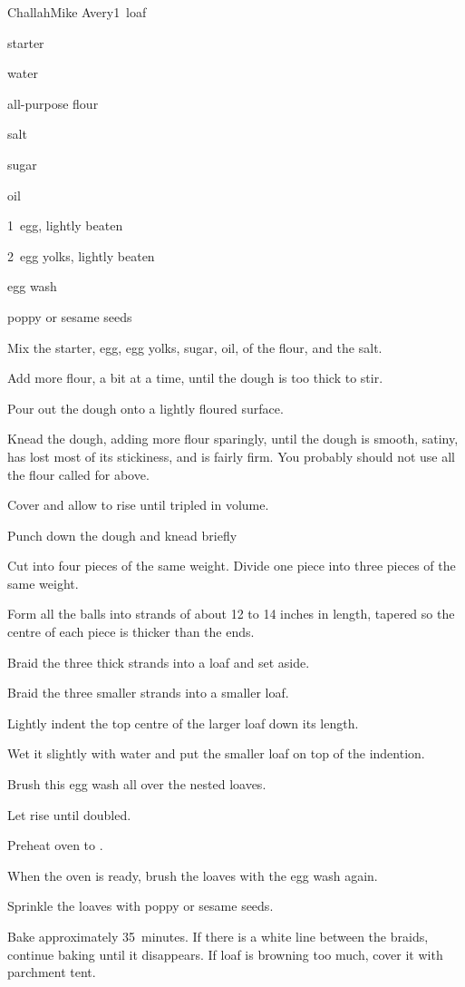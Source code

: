 \begin{recipe}{Challah\FIXME}{Mike Avery}{1~loaf}

\begin{ingredients}
\item {} starter
\item \C{\half} water
\item \C{3\twothird} all-purpose flour
\item {} salt
\item \C{\quarter} sugar
\item \C{\quarter} oil
\item 1~egg, lightly beaten
\item 2~egg yolks, lightly beaten
\item egg wash
\item poppy or sesame seeds
\end{ingredients}

\begin{directions}
\item Mix the starter, egg, egg yolks, sugar, oil, \half{} of the flour, and the salt. 
\item Add more flour, a bit at a time, until the dough is too thick to stir.
\item Pour out the dough onto a lightly floured surface.
\item Knead the dough, adding more flour sparingly, until the dough is smooth, satiny, has lost most of its stickiness, and is fairly firm. You probably should not use all the flour called for above.
\item Cover and allow to rise until tripled in volume.
\item Punch down the dough and knead briefly
\item Cut into four pieces of the same weight. Divide one piece into three pieces of the same weight.
\item Form all the balls into strands of about 12 to 14 inches in length, tapered so the centre of each piece is thicker than the ends.
\item Braid the three thick strands into a loaf and set aside.
\item Braid the three smaller strands into a smaller loaf.
\item Lightly indent the top centre of the larger loaf down its length.
\item Wet it slightly with water and put the smaller loaf on top of the indention.
\item Brush this egg wash all over the nested loaves.
\item Let rise until doubled.
\item Preheat oven to .
\item When the oven is ready, brush the loaves with the egg wash again.
\item Sprinkle the loaves with poppy or sesame seeds.
\item Bake approximately 35~minutes. If there is a white line between the braids, continue baking until it disappears. If loaf is browning too much, cover it with parchment tent.
\end{directions}

\end{recipe}
